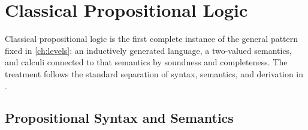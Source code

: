 \part{Classical Propositional Logic}
\label{part:classical-propositional}

Classical propositional logic is the first complete instance of the general
pattern fixed in \cref{ch:levels}: an inductively generated language, a
two-valued semantics, and calculi connected to that semantics by soundness and
completeness.  The treatment follows the standard separation of syntax,
semantics, and derivation in \cite{EbbinghausFlumThomas1994,OpenLogic2026}.

\chapter{Propositional Syntax and Semantics}
\label{ch:prop-syntax-semantics}


